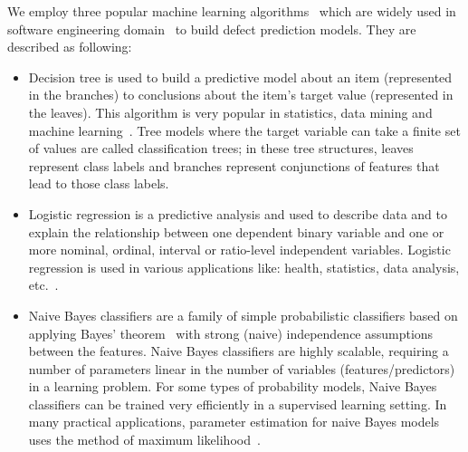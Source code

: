 We employ three popular machine learning algorithms~\cite{bishop2006pattern} which are widely used in software engineering domain~\cite{wang2016automatically, wang2013using, jing2014dictionary} to build defect prediction models. They are described as following: 
\begin{itemize}
	\item Decision tree is used to build a predictive model about an item (represented in the branches) to conclusions about the item's target value (represented in the leaves). This algorithm is very popular in statistics, data mining and machine learning~\cite{safavian1991survey}. Tree models where the target variable can take a finite set of values are called classification trees; in these tree structures, leaves represent class labels and branches represent conjunctions of features that lead to those class labels.
	\item Logistic regression is a predictive analysis and used to describe data and to explain the relationship between one dependent binary variable and one or more nominal, ordinal, interval or ratio-level independent variables. Logistic regression is used in various applications like: health, statistics, data analysis, etc.~\cite{hosmer2013applied}.
	\item Naive Bayes classifiers are a family of simple probabilistic classifiers based on applying Bayes' theorem~\cite{vapnik1998statistical} with strong (naive) independence assumptions between the features. Naive Bayes classifiers are highly scalable, requiring a number of parameters linear in the number of variables (features/predictors) in a learning problem. For some types of probability models, Naive Bayes classifiers can be trained very efficiently in a supervised learning setting. In many practical applications, parameter estimation for naive Bayes models uses the method of maximum likelihood~\cite{pan2002maximum}.
\end{itemize}




